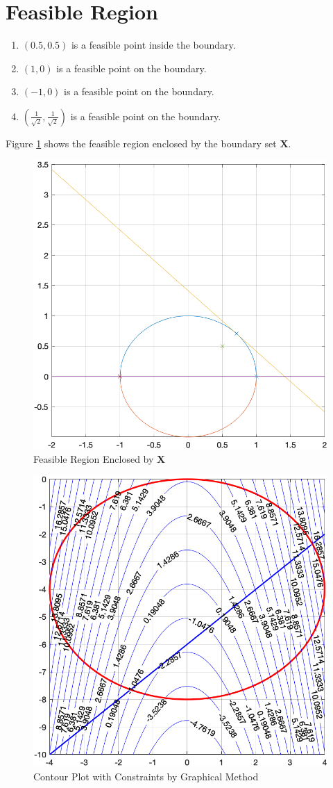 \section{Feasible Region}
\begin{enumerate}
    \item $(0.5, 0.5)$ is a feasible point inside the boundary.
    \item $(1, 0)$ is a feasible point on the boundary.
    \item $(-1, 0)$ is a feasible point on the boundary.
    \item $(\frac{1}{\sqrt{2}},\frac{1}{\sqrt{2}})$ is a feasible point on the boundary.
\end{enumerate}
Figure \ref{fig:hw3_p3_feasible} shows the feasible region enclosed by the boundary set $\mathbf{X}$.
\begin{figure}
    \centering
    \includegraphics[width=0.5\linewidth]{hw3/prob3_plot.png}
    \caption{Feasible Region Enclosed by $\mathbf{X}$}
    \label{fig:hw3_p3_feasible}
\end{figure}


\begin{figure}
    \centering
    \includegraphics[width=0.5\linewidth]{hw3/prob4_plot.png}
    \caption{Contour Plot with Constraints by Graphical Method}
    \label{fig:hw3_prob4_contour}
\end{figure}

